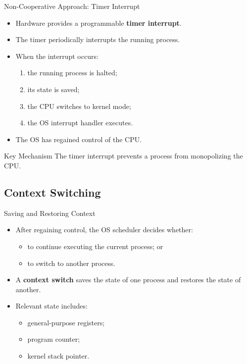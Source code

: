 \begin{frame}{Non-Cooperative Approach: Timer Interrupt}

\begin{itemize}
    \item Hardware provides a programmable
          \textbf{timer interrupt}.
    \item The timer periodically interrupts the running process.
    \item When the interrupt occurs:
    \begin{enumerate}
        \item the running process is halted;
        \item its state is saved;
        \item the CPU switches to kernel mode;
        \item the OS interrupt handler executes.
    \end{enumerate}
    \item The OS has regained control of the CPU.
\end{itemize}

\begin{block}{Key Mechanism}
The timer interrupt prevents a process from monopolizing the CPU.
\end{block}

\end{frame}

\subsection*{Context Switching}

\begin{frame}{Saving and Restoring Context}

\begin{itemize}
    \item After regaining control, the OS scheduler decides whether:
    \begin{itemize}
        \item to continue executing the current process; or
        \item to switch to another process.
    \end{itemize}

    \item A \textbf{context switch} saves the state of one process
          and restores the state of another.

    \item Relevant state includes:
    \begin{itemize}
        \item general-purpose registers;
        \item program counter;
        \item kernel stack pointer.
    \end{itemize}
\end{itemize}

\end{frame}

